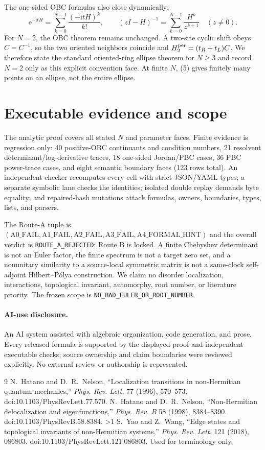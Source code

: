 \documentclass[10pt]{article}
\providecommand{\CRevisionRound}{2}
\newcommand{\ii}{\mathrm{i}}
\newcommand{\e}{\mathrm{e}}
\begin{document}
The one-sided OBC formulas also close dynamically:
\[
 \e^{-\ii tH}=\sum_{k=0}^{N-1}\frac{(-\ii tH)^k}{k!},\qquad
 (zI-H)^{-1}=\sum_{k=0}^{N-1}\frac{H^k}{z^{k+1}}\quad(z\ne0).
\]
For $N=2$, the OBC theorem remains unchanged.  A two-site cyclic shift obeys
$C=C^{-1}$, so the two oriented neighbors coincide and
$H_2^{\rm per}=(t_R+t_L)C$.  We therefore state the standard oriented-ring
ellipse theorem for $N\ge3$ and record $N=2$ only as this explicit convention
face.  At finite $N$, (5) gives finitely many points on an ellipse, not the
entire ellipse.

\section{Executable evidence and scope}
The analytic proof covers all stated $N$ and parameter faces.  Finite evidence
is regression only: 40 positive-OBC continuants and condition numbers, 21
resolvent determinant/log-derivative traces, 18 one-sided Jordan/PBC cases, 36
PBC power-trace cases, and eight semantic boundary faces (123 rows total).
An independent checker recomputes every cell with strict JSON/YAML types; a
separate symbolic lane checks the identities; isolated double replay demands
byte equality; and repaired-hash mutations attack formulas, owners, boundaries,
types, lists, and parsers.

The Route-A tuple is
$(\mathrm{A0\_FAIL},\mathrm{A1\_FAIL},\mathrm{A2\_FAIL},
\mathrm{A3\_FAIL},\mathrm{A4\_FORMAL\_HINT})$ and the overall verdict is
\texttt{ROUTE\_A\_REJECTED}; Route B is locked.  A finite Chebyshev determinant
is not an Euler factor, the finite spectrum is not a target zero set, and a
nonunitary similarity to a source-local symmetric matrix is not a same-clock
self-adjoint Hilbert--P\'olya construction.  We claim no disorder localization,
interactions, topological invariant, automorphy, root number, or literature
priority.  The frozen scope is \texttt{NO\_BAD\_EULER\_OR\_ROOT\_NUMBER}.

\paragraph{AI-use disclosure.}
An AI system assisted with algebraic organization, code generation, and prose.
Every released formula is supported by the displayed proof and independent
executable checks; source ownership and claim boundaries were reviewed
explicitly.  No external review or authorship is represented.
\fi

\begin{thebibliography}{9}
 N.~Hatano and D.~R.~Nelson,
``Localization transitions in non-Hermitian quantum mechanics,''
\emph{Phys. Rev. Lett.} 77 (1996), 570--573.
doi:10.1103/PhysRevLett.77.570.
 N.~Hatano and D.~R.~Nelson,
``Non-Hermitian delocalization and eigenfunctions,''
\emph{Phys. Rev. B} 58 (1998), 8384--8390.
doi:10.1103/PhysRevB.58.8384.
\ifnum\CRevisionRound>1
 S.~Yao and Z.~Wang,
``Edge states and topological invariants of non-Hermitian systems,''
\emph{Phys. Rev. Lett.} 121 (2018), 086803.
doi:10.1103/PhysRevLett.121.086803.  Used for terminology only.
\fi
\end{thebibliography}
\end{document}

